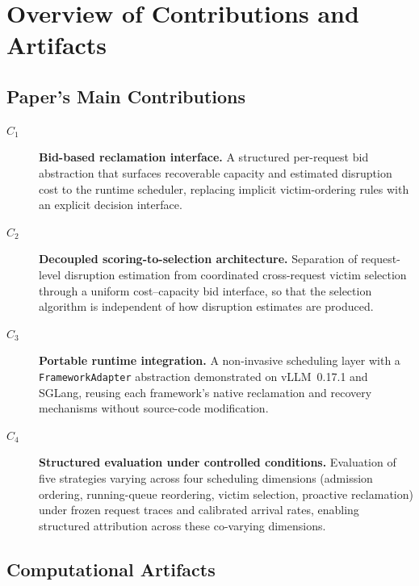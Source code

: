 \documentclass[conference]{IEEEtran}
\begin{document}


\appendixAD

\section{Overview of Contributions and Artifacts}

\subsection{Paper's Main Contributions}

\begin{description}
\item[$C_1$] \textbf{Bid-based reclamation interface.}
  A structured per-request bid abstraction that surfaces recoverable capacity
  and estimated disruption cost to the runtime scheduler, replacing implicit
  victim-ordering rules with an explicit decision interface.

\item[$C_2$] \textbf{Decoupled scoring-to-selection architecture.}
  Separation of request-level disruption estimation from coordinated
  cross-request victim selection through a uniform cost--capacity bid
  interface, so that the selection algorithm is independent of how
  disruption estimates are produced.

\item[$C_3$] \textbf{Portable runtime integration.}
  A non-invasive scheduling layer with a \texttt{FrameworkAdapter} abstraction
  demonstrated on vLLM~0.17.1 and SGLang, reusing each framework's native
  reclamation and recovery mechanisms without source-code modification.

\item[$C_4$] \textbf{Structured evaluation under controlled conditions.}
  Evaluation of five strategies varying across four scheduling dimensions
  (admission ordering, running-queue reordering, victim selection, proactive
  reclamation) under frozen request traces and calibrated arrival rates,
  enabling structured attribution across these co-varying dimensions.
\end{description}


\subsection{Computational Artifacts}
\end{document}
